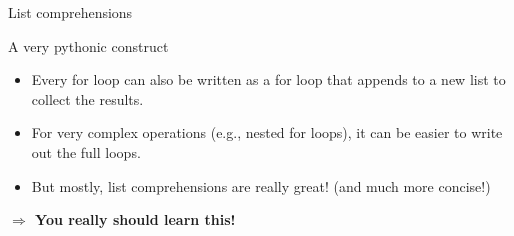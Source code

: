 \documentclass{beamer}
\begin{document}
\begin{frame}[fragile]{List comprehensions}
\begin{alertblock}{A very pythonic construct}
\begin{itemize}
\item Every for loop can also be written as a for loop that appends to a new list to collect the results. 
\item For very complex operations (e.g., nested for loops), it can be easier to write out the full loops. 
\item But mostly, list comprehensions are really great! (and much more concise!)
\end{itemize}
\end{alertblock}
\textbf{$\Rightarrow$ You really should learn this!}
\end{frame}




\begin{frame}[plain]
\printbibliography
\end{frame}
\end{document}
